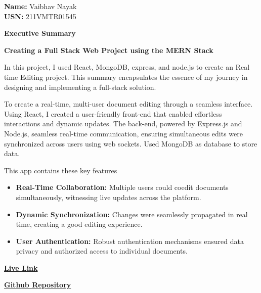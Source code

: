 \documentclass{article}
\begin{document}
\vspace{25pt}


\hfill %
\begin{minipage}[t]{0.45\linewidth}
    \raggedleft %
   {\bfseries Name:} Vaibhav Nayak \\
    {\bfseries USN:} 211VMTR01545
\end{minipage}

\newpage
\begin{center}
    \LARGE\bfseries Executive Summary \\
\end{center}

\vspace{25pt}

{\Large\bfseries Creating a Full Stack Web Project using the MERN Stack \\}

{\large In this project, I used React, MongoDB, express, and node.js to create an Real time Editing project. This summary encapsulates the essence of my journey in designing and implementing a full-stack solution.}

\vspace{10pt}

{\large  To create a real-time, multi-user document editing through a seamless
interface. Using React, I created a user-friendly front-end that enabled effortless
interactions and dynamic updates. The back-end, powered by Express.js and Node.js,
seamless real-time communication, ensuring simultaneous edits were synchronized across
users using web sockets. Used MongoDB as database to store data.
}

\vspace{10pt}

{\large This app contains these key features}

\begin{itemize}
    \item {\bfseries Real-Time Collaboration:} Multiple users could coedit documents simultaneously, witnessing live updates across the platform.
    \item {\bfseries Dynamic Synchronization:} Changes were seamlessly propagated in real time, creating a good editing experience.
    \item {\bfseries User Authentication:} Robust authentication mechanisms ensured data privacy and authorized access to individual documents.
    
\end{itemize}
\begin{minipage}[t]{0.45\linewidth}
    \raggedright %
    {\bfseries \href{https://real-time-editing.vercel.app/}{Live Link}}      \\
\end{minipage}
\hfill %
\begin{minipage}[t]{0.45\linewidth}
    \raggedleft %
   {\bfseries  \href{https://github.com/vaibhav-nayak18/real-time-editing}{Github Repository} }\\
    
\end{minipage}
\end{document}
